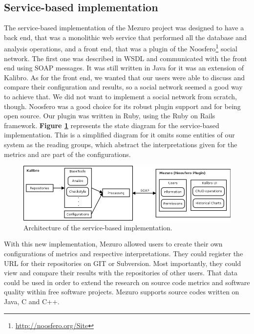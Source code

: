 \subsection{Service-based implementation}
\label{subsec:service-based-implementation}

The service-based implementation of the Mezuro project was designed to have a back end, that was a monolithic web service that performed all the database and analysis operations, and a front end, that was a plugin of the Noosfero\footnote{\url{http://noosfero.org/Site}} social network. The first one was described in WSDL and communicated with the front end using SOAP messages. It was still written in Java for it was an extension of Kalibro. As for the front end, we wanted that our users were able to discuss and compare their configuration and results, so a social network seemed a good way to achieve that. We did not want to implement a social network from scratch, though. Noosfero was a good choice for its robust plugin support and for being open source. Our plugin was written in Ruby, using the Ruby on Rails framework. \textbf{Figure \ref{fig:mezuro-noosfero-arch}} represents the state diagram for the service-based implementation. This is a simplified diagram for it omits some entities of our system as the reading groups, which abstract the interpretations given for the metrics and are part of the configurations.

\begin{figure}[htb]
  \centering
  \includegraphics[width=\textwidth]{images/mezuro-noosfero-arch.png}
  \caption{Architecture of the service-based implementation.}
  \label{fig:mezuro-noosfero-arch}
\end{figure}

With this new implementation, Mezuro allowed users to create their own configurations of metrics and respective interpretations. They could register the URL for their repositories on GIT or Subversion. Most importantly, they could view and compare their results with the repositories of other users. That data could be used in order to extend the research on source code metrics and software quality within free software projects. Mezuro supports source codes written on Java, C and C++.

